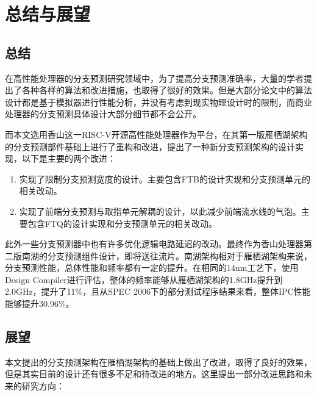 
\chapter{总结与展望}

\section{总结}

在高性能处理器的分支预测研究领域中，为了提高分支预测准确率，大量的学者提出了各种各样的算法和改进措施，也取得了很好的效果。但是大部分论文中的算法设计都是基于模拟器进行性能分析，并没有考虑到现实物理设计时的限制，而商业处理器的分支预测具体设计大部分细节都不会公开。

而本文选用香山这一RISC-V开源高性能处理器作为平台，在其第一版雁栖湖架构的分支预测部件基础上进行了重构和改进，提出了一种新分支预测架构的设计实现，以下是主要的两个改进：

\begin{enumerate}
    \item 实现了限制分支预测宽度的设计。主要包含FTB的设计实现和分支预测单元的相关改动。
    \item 实现了前端分支预测与取指单元解耦的设计，以此减少前端流水线的气泡。主要包含FTQ的设计实现和分支预测单元的相关改动。
\end{enumerate}

此外一些分支预测器中也有许多优化逻辑电路延迟的改动。最终作为香山处理器第二版南湖的分支预测组件设计，即将送往流片。南湖架构相对于雁栖湖架构来说，分支预测性能，总体性能和频率都有一定的提升。在相同的14nm工艺下，使用Design Compiler进行评估，整体的频率能够从雁栖湖架构的1.8GHz提升到2.0GHz，提升了11\%，且从SPEC 2006下的部分测试程序结果来看，整体IPC性能能够提升30.96\%。

\section{展望}

本文提出的分支预测架构在雁栖湖架构的基础上做出了改进，取得了良好的效果，但是其实目前的设计还有很多不足和待改进的地方。这里提出一部分改进思路和未来的研究方向：


